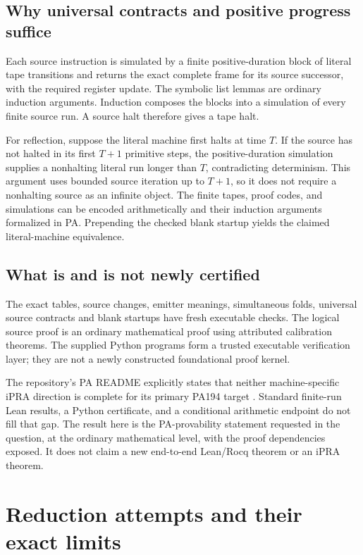 \documentclass[11pt,letterpaper]{article}
\begin{document}
\subsection{Why universal contracts and positive progress suffice}

Each source instruction is simulated by a finite positive-duration block of
literal tape transitions and returns the exact complete frame for its source
successor, with the required register update. The symbolic list lemmas are
ordinary induction arguments. Induction composes the blocks into a simulation
of every finite source run. A source halt therefore gives a tape halt.

For reflection, suppose the literal machine first halts at time $T$. If the
source has not halted in its first $T+1$ primitive steps, the positive-duration
simulation supplies a nonhalting literal run longer than $T$, contradicting
determinism. This argument uses bounded source iteration up to $T+1$, so it
does not require a nonhalting source as an infinite object. The finite tapes,
proof codes, and simulations can be encoded arithmetically and their induction
arguments formalized in PA. Prepending the checked blank startup yields the
claimed literal-machine equivalence.

\subsection{What is and is not newly certified}

The exact tables, source changes, emitter meanings, simultaneous folds,
universal source contracts and blank startups have fresh executable checks.
The logical source proof is an ordinary mathematical proof using attributed
calibration theorems. The supplied Python programs form a trusted executable
verification layer; they are not a newly constructed foundational proof kernel.

The repository's PA README explicitly states that neither machine-specific
iPRA direction is complete for its primary PA194 target \cite{status}.
Standard finite-run Lean results, a Python certificate, and a conditional
arithmetic endpoint do not fill that gap. The result here is the PA-provability
statement requested in the question, at the ordinary mathematical level, with
the proof dependencies exposed. It does not claim a new end-to-end Lean/Rocq
theorem or an iPRA theorem.

\section{Reduction attempts and their exact limits}
\label{sec:negative}
\end{document}
